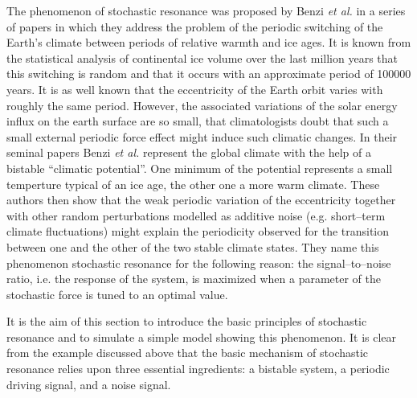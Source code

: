 The phenomenon of stochastic resonance was proposed by Benzi \textit{et al.}
\cite{Benzi1,Benzi2} in a series of papers in which they address the problem
of the periodic switching of the Earth's climate between periods of relative
warmth and ice ages. It is known from the statistical analysis of continental
ice volume over the last million years that this switching is random and that 
it occurs with an approximate period of 100000 years. It is as well known that
the eccentricity of the Earth orbit varies with roughly the same period. 
However,
the associated variations of the solar energy influx on the earth surface are
so small, that climatologists doubt that  such a small external periodic force
effect might induce such climatic changes. In their seminal papers Benzi
\textit{et al.} represent the global climate with the help of a bistable
``climatic potential''. One minimum of the potential represents a small
temperture typical of an ice age, the other one a more  warm climate.
These authors then show that the weak periodic variation of the eccentricity
together with other random perturbations modelled as additive noise (e.g.
short--term climate fluctuations) might explain the periodicity observed for
the transition between one and the other of the two stable climate 
states. They name this
phenomenon stochastic resonance for the following reason: the
signal--to--noise ratio, i.e. the response of the system, is maximized when a
parameter of the stochastic force is tuned to an optimal value.

It is the aim of this section to introduce the basic principles of stochastic
resonance \cite{McNamara,Gammaitoni} and to simulate a simple model 
showing this phenomenon.
It is clear from the example discussed above that the basic mechanism  of 
stochastic resonance relies upon three essential ingredients:
a bistable system, a periodic driving signal, and a noise signal.

